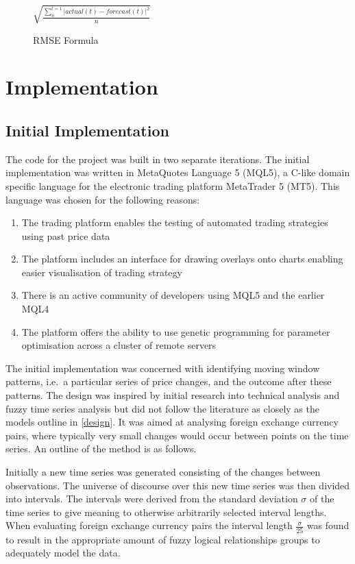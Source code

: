 \documentclass[12pt, oneside, a4paper]{article}
\theoremstyle{definition}
\begin{document}
\begin{figure}[H]
    \centering
    \caption{RMSE Formula}
    $\sqrt{\frac{\sum_{n}^{t=1}|actual(t)-forecast(t)|^{2}}{n}}$
    \label{rmse}
\end{figure}
 


\section{Implementation}

\label{implementation}

\subsection{Initial Implementation}

The code for the project was built in two separate iterations. The initial implementation was written in MetaQuotes Language 5 (MQL5), a C-like domain specific language for the electronic trading platform MetaTrader 5 (MT5). This language was chosen for the following reasons:

\begin{enumerate}[label=\roman*]
\item The trading platform enables the testing of automated trading strategies using past price data
\item The platform includes an interface for drawing overlays onto charts enabling easier visualisation of trading strategy
\item There is an active community of developers using MQL5 and the earlier MQL4
\item The platform offers the ability to use genetic programming for parameter optimisation across a cluster of remote servers 
\end{enumerate}

The initial implementation was concerned with identifying moving window patterns, i.e.\ a particular series of price changes, and the outcome after these patterns. The design was inspired by initial research into technical analysis and fuzzy time series analysis but did not follow the literature as closely as the models outline in \cref{design}. It was aimed at analysing foreign exchange currency pairs, where typically very small changes would occur between points on the time series. An outline of the method is as follows.

Initially a new time series was generated consisting of the changes between observations. The universe of discourse over this new time series was then divided into intervals. The intervals were derived from the standard deviation $\sigma$ of the time series to give meaning to otherwise arbitrarily selected interval lengths. When evaluating foreign exchange currency pairs the interval length $\frac{\sigma}{25}$ was found to result in the appropriate amount of fuzzy logical relationships groups to adequately model the data.
\end{document}
